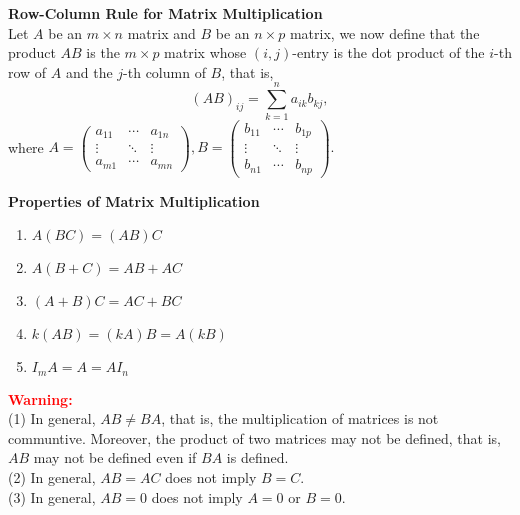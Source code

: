 \documentclass[10pt, a4paper]{article}
\begin{document}
\begin{proposition}
    \textbf{Row-Column Rule for Matrix Multiplication}\\
    Let $A$ be an $m\times n$ matrix and $B$ be an $n\times p$ matrix, we now define that the product $AB$ is the $m\times p$ matrix whose $(i,j)$-entry is the dot product of the $i$-th row of $A$ and the $j$-th column of $B$, that is, $$(AB)_{ij} = \sum_{k=1}^n a_{ik}b_{kj},$$
    where $A=\begin{pmatrix}
            a_{11} & \cdots & a_{1n} \\
            \vdots & \ddots & \vdots \\
            a_{m1} & \cdots & a_{mn}
        \end{pmatrix}, B=\begin{pmatrix}
            b_{11} & \cdots & b_{1p} \\
            \vdots & \ddots & \vdots \\
            b_{n1} & \cdots & b_{np}
        \end{pmatrix}.$
\end{proposition}
\begin{proposition}
    \textbf{Properties of Matrix Multiplication}
    \begin{enumerate}
        \item $A(BC) = (AB)C$
        \item $A(B + C) = AB + AC$
        \item $(A + B)C = AC + BC$
        \item $k(AB) = (kA)B = A(kB)$
        \item $I_mA = A = AI_n$
    \end{enumerate}
    \textcolor{red}{\textbf{Warning:}} \\
    (1)  In general, $AB\neq BA$, that is, the multiplication of matrices is not communtive. Moreover, the product of two matrices may not be defined, that is, $AB$ may not be defined even if $BA$ is defined.\\
    (2)  In general, $AB=AC$ does not imply $B=C$.\\
    (3)  In general, $AB=0$ does not imply $A=0$ or $B=0$.
\end{proposition}
\end{document}
